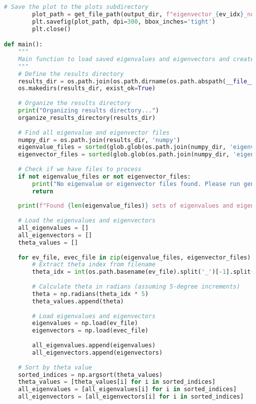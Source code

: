 \begin{lstlisting}[language=Python]
        # Save the plot to the plots subdirectory
        plot_path = get_file_path(output_dir, f"eigenvector_{ev_idx}_no_labels.png", "png")
        plt.savefig(plot_path, dpi=300, bbox_inches='tight')
        plt.close()

def main():
    """
    Main function to load saved eigenvalues and eigenvectors and create improved plots.
    """
    # Define the results directory
    results_dir = os.path.join(os.path.dirname(os.path.abspath(__file__)), 'results')
    os.makedirs(results_dir, exist_ok=True)
    
    # Organize the results directory
    print("Organizing results directory...")
    organize_results_directory(results_dir)
    
    # Find all eigenvalue and eigenvector files
    numpy_dir = os.path.join(results_dir, 'numpy')
    eigenvalue_files = sorted(glob.glob(os.path.join(numpy_dir, 'eigenvalues_theta_*.npy')))
    eigenvector_files = sorted(glob.glob(os.path.join(numpy_dir, 'eigenvectors_theta_*.npy')))
    
    # Check if we have files to process
    if not eigenvalue_files or not eigenvector_files:
        print("No eigenvalue or eigenvector files found. Please run generate_plots_no_connections.py first.")
        return
    
    print(f"Found {len(eigenvalue_files)} sets of eigenvalues and eigenvectors.")
    
    # Load the eigenvalues and eigenvectors
    all_eigenvalues = []
    all_eigenvectors = []
    theta_values = []
    
    for ev_file, evec_file in zip(eigenvalue_files, eigenvector_files):
        # Extract theta index from filename
        theta_idx = int(os.path.basename(ev_file).split('_')[-1].split('.')[0])
        
        # Calculate theta in radians (assuming 5-degree increments)
        theta = np.radians(theta_idx * 5)
        theta_values.append(theta)
        
        # Load eigenvalues and eigenvectors
        eigenvalues = np.load(ev_file)
        eigenvectors = np.load(evec_file)
        
        all_eigenvalues.append(eigenvalues)
        all_eigenvectors.append(eigenvectors)
    
    # Sort by theta value
    sorted_indices = np.argsort(theta_values)
    theta_values = [theta_values[i] for i in sorted_indices]
    all_eigenvalues = [all_eigenvalues[i] for i in sorted_indices]
    all_eigenvectors = [all_eigenvectors[i] for i in sorted_indices]
    

\end{lstlisting}
